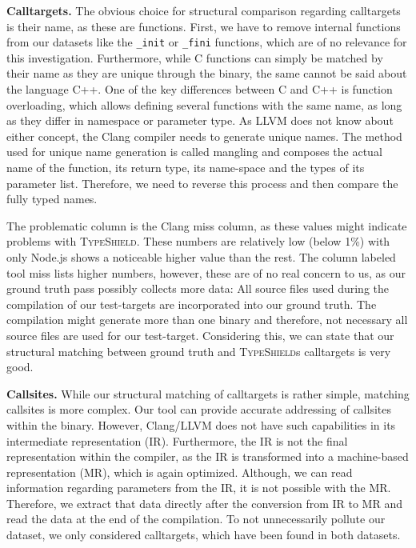\textbf{Calltargets.} The obvious choice for structural comparison regarding calltargets is their name, as these are functions. First, we have to remove internal 
functions from our datasets like the \texttt{\_init} or \texttt{\_fini} functions, which are of no relevance for this investigation. Furthermore, while C functions can
simply be matched by their name as they are unique through the binary, the same cannot be said about the language C++. One of the key differences between C and C++ is 
function overloading, which allows defining several functions with the same name, as long as they differ in namespace or parameter type. 
As LLVM does not know about either concept, the Clang compiler needs to generate unique names. The method used for unique name generation is called mangling and composes
the actual name of the function, its return type, its name-space and the types of its parameter list. Therefore, we need to reverse this process and then compare the fully
typed names. 

The problematic column is the Clang miss column, as these values might indicate problems with \textsc{TypeShield}. These numbers are relatively low (below 1\%) with only Node.js
shows a noticeable higher value than the rest. The column labeled tool miss lists higher numbers, however, these are of no real concern to us, as our ground truth 
pass possibly collects more data: All source files used during the compilation of our test-targets are incorporated into our ground truth. The compilation might generate more than
one binary and therefore, not necessary all source files are used for our test-target.
Considering this, we can state that our structural matching between ground truth and \textsc{TypeShield}s calltargets is very good.

\textbf{Callsites.} While our structural matching of calltargets is rather simple, matching callsites is more complex. Our tool can provide accurate addressing of 
callsites within the binary. However, Clang/LLVM does not have such capabilities in its intermediate representation (IR). Furthermore, the IR is not the final representation within
the compiler, as the IR is transformed into a machine-based representation (MR), which is again optimized. Although, we can read information regarding parameters from the IR, it 
is not possible with the MR. Therefore, we extract that data directly after the conversion from IR to MR and read the data at the end of the compilation. To not unnecessarily 
pollute our dataset, we only considered calltargets, which have been found in both datasets. 

